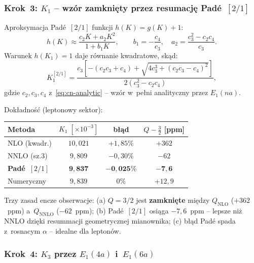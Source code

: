 \subsubsection{Krok~3: $K_1$ -- wzór zamkni\k{e}ty przez resumacj\k{e} Pad\'e~$[2/1]$}%
\label{app:F-K1-pade}

Aproksymacja Pad\'e~$[2/1]$ funkcji $h(K)=g(K)+1$:
\[
  h(K)\approx\frac{c_2 K+a_2 K^2}{1+b_1 K},
  \qquad
  b_1=-\frac{c_4}{c_3},\quad
  a_2=\frac{c_3^2-c_2 c_4}{c_3}.
\]
Warunek $h(K_1)=1$ daje r\'ownanie kwadratowe, sk\k{a}d:
\begin{equation}\label{eq:K1-P21}
\boxed{
  K_1^{[2/1]}
  = \frac{c_3\!\left[-(c_2 c_3+c_4)+
    \sqrt{4c_3^3+(c_2 c_3-c_4)^2}\right]}
    {2(c_3^2-c_2 c_4)},
}
\end{equation}
gdzie $c_2,c_3,c_4$ z~\eqref{eq:cn-analytic}
-- wzór w~pe\l{}ni analityczny przez $E_1(na)$.
\par\smallskip
\noindent Dok\l{}adno\'s\'c (leptonowy sektor):
\begin{center}
\begin{tabular}{lccc}
\toprule
Metoda & $K_1\;[\times10^{-3}]$ & b\l{}\k{a}d & $Q-\tfrac{3}{2}$ [ppm] \\
\midrule
NLO (kwadr.) & $10{,}021$ & $+1{,}85\%$ & $+362$ \\
NNLO (sz.3) & $9{,}809$ & $-0{,}30\%$ & $-62$ \\
\textbf{Pad\'e~$[2/1]$} & $\mathbf{9{,}837}$
                         & $\mathbf{-0{,}025\%}$ & $\mathbf{-7{,}6}$ \\
Numeryczny & $9{,}839$ & $0\%$ & $+12{,}9$ \\
\bottomrule
\end{tabular}
\end{center}
Trzy zasad encze obserwacje:
(a) $Q=3/2$ jest \textbf{zamkni\k{e}te} mi\k{e}dzy
    $Q_\mathrm{NLO}$ ($+362$~ppm) a~$Q_\mathrm{NNLO}$ ($-62$~ppm);
(b) Pad\'e~$[2/1]$ osi\k{a}ga $-7{,}6$~ppm -- lepsze ni\.z NNLO
    dzi\k{e}ki resummacji geometrycznej mianownika;
(c) b\l{}\k{a}d Pad\'e spada z~rosnacym $\alpha$ -- idealne dla leptonów.

\subsubsection{Krok~4: $K_3$ przez $E_1(4a)$ i~$E_1(6a)$}%
\label{app:F-K3}

